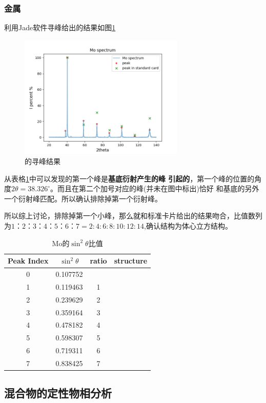 \documentclass[10pt]{ctexart}
\begin{document}
\subsubsection{金属}
利用Jade软件寻峰给出的结果如图\ref{fig:Mo}
\begin{figure}
    \centering
    \includegraphics[width=0.7\textwidth]{data/Mo/spectrum.png}
    \caption{的寻峰结果}
    \label{fig:Mo}
\end{figure}
从表格\ref{tab:MoPeakRatio}中可以发现的第一个峰是\textbf{基底衍射产生的峰
引起的}，第一个峰的位置的角度$2\theta=38.326^\circ$。而且在第二个加号对应的峰(并未在图中标出)恰好
和基底的另外一个衍射峰匹配。所以确认排除掉第一个衍射峰。

所以综上讨论，排除掉第一个小峰，那么就和标准卡片给出的结果吻合，比值数列为$1：2：3：4：5：6：7=2:4:6:8:10:12:14$,确认结构为体心立方结构。
\begin{table}
    \begin{tabular}{|c|c|c|c|}
        \textbf{Peak Index} & \textbf{$\sin^2{\theta}$}& \textbf{ratio}& \textbf{structure}\\
        \hline
0  &  0.107752&&\\
1  &  0.119463&1&\\
2  &  0.239629&2&\\
3  &  0.359164&3&\\
4  &  0.478182&4&\\
5  &  0.598307&5&\\
6  &  0.719311&6&\\
7  &  0.838425&7&\\
\end{tabular}
\centering
    \caption{Mo的$\sin^2{\theta}$比值}
    \label{tab:MoPeakRatio}
\end{table}
\subsection{混合物的定性物相分析}
\end{document}
